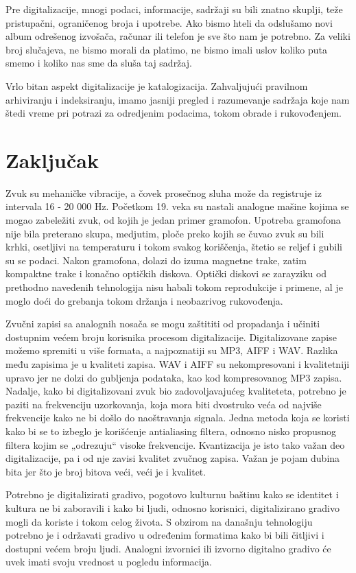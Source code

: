 Pre digitalizacije, mnogi podaci, informacije, sadržaji su bili znatno skuplji, teže pristupačni, ograničenog broja i upotrebe. Ako bismo hteli da odslušamo novi album odrešenog izvošača, računar ili telefon je sve što nam je potrebno. Za veliki broj slučajeva, ne bismo morali da platimo, ne bismo imali uslov koliko puta smemo i koliko nas sme da sluša taj sadržaj. 
 
Vrlo bitan aspekt digitalizacije je katalogizacija. Zahvaljujući pravilnom arhiviranju i indeksiranju, imamo jasniji pregled i razumevanje sadržaja koje nam štedi vreme pri potrazi za odredjenim podacima, tokom obrade i rukovođenjem.
\section{Zaključak}
\label{sec:zakljucak}

Zvuk su mehaničke vibracije, a čovek prosečnog sluha može da registruje iz intervala 16 - 20 000 Hz. Početkom 19. veka su nastali analogne mašine kojima se mogao zabeležiti zvuk, od kojih je jedan primer gramofon. Upotreba gramofona nije bila preterano skupa, medjutim, ploče preko kojih se čuvao zvuk su bili krhki, osetljivi na temperaturu i tokom svakog koriščenja, štetio se reljef i gubili su se podaci. Nakon gramofona, dolazi do izuma magnetne trake, zatim kompaktne trake i konačno optičkih diskova. Optički diskovi se zarayziku od prethodno navedenih tehnologija nisu habali tokom reprodukcije i primene, al je moglo doći do grebanja tokom držanja i neobazrivog rukovođenja.

Zvučni zapisi sa analognih nosača se mogu  zaštititi od propadanja i učiniti dostupnim većem broju korisnika procesom digitalizacije. Digitalizovane zapise možemo spremiti u više
formata, a najpoznatiji su MP3, AIFF i WAV. Razlika među zapisima je u kvaliteti zapisa. WAV i AIFF su nekompresovani i kvalitetniji upravo jer ne dolzi do gubljenja podataka, kao kod kompresovanog MP3 zapisa. Nadalje, kako bi digitalizovani
zvuk bio zadovoljavajućeg kvaliteteta, potrebno je paziti na frekvenciju uzorkovanja, koja mora biti dvostruko veća od najviše frekvencije kako ne bi došlo do naoštravanja signala. Jedna metoda koja se koristi kako bi se to izbeglo je korišćenje antialiasing filtera, odnosno nisko
propusnog filtera kojim se „odrezuju“ visoke frekvencije. Kvantizacija je isto tako važan deo digitalizacije, pa i od nje zavisi kvalitet zvučnog zapisa. Važan je pojam dubina bita jer što je broj bitova veći, veći je i kvalitet.

Potrebno je digitalizirati gradivo, pogotovo kulturnu baštinu kako se identitet i kultura ne bi zaboravili i kako bi ljudi, odnosno korisnici, digitalizirano gradivo mogli da koriste i tokom celog života. S obzirom na današnju tehnologiju potrebno je i održavati gradivo u određenim formatima kako bi bili čitljivi i dostupni većem broju ljudi.
Analogni izvornici ili izvorno digitalno gradivo će uvek imati svoju vrednost u pogledu informacija.
